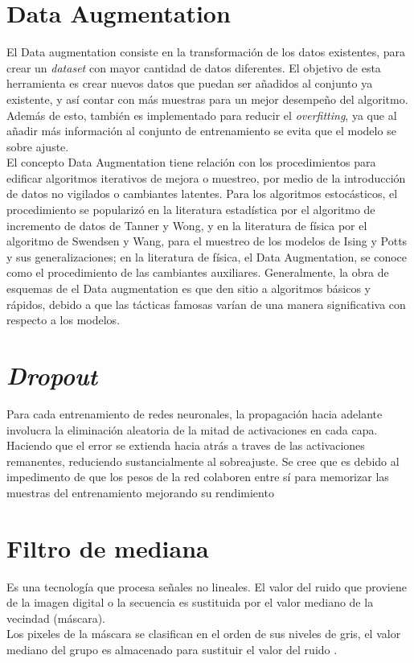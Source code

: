 \section{Data Augmentation}
El Data augmentation consiste en la transformación de los datos existentes, para crear un \textit{dataset} con mayor cantidad de datos diferentes. El objetivo de esta herramienta es crear nuevos datos que puedan ser añadidos al conjunto ya existente, y así contar con más muestras para un mejor desempeño del algoritmo. Además de esto, también es implementado para reducir el \textit{overfitting}, ya que al añadir más información al conjunto de entrenamiento se evita que el modelo se sobre ajuste. \\


El concepto Data Augmentation tiene relación con los procedimientos para edificar algoritmos iterativos de mejora o muestreo, por medio de la introducción de datos no vigilados o cambiantes latentes. Para los algoritmos estocásticos, el procedimiento se popularizó en la literatura estadística por el algoritmo de incremento de datos de Tanner y Wong, y en la literatura de física por el algoritmo de Swendsen y Wang, para el muestreo de los modelos de Ising y Potts y sus generalizaciones; en la literatura de física, el Data Augmentation, se conoce como el procedimiento de las cambiantes auxiliares. Generalmente, la obra de esquemas de el Data augmentation es que den sitio a algoritmos básicos y rápidos, debido a que las tácticas famosas varían de una manera significativa con respecto a los modelos.\cite{van2001art}

\section{\textit{Dropout}}

Para cada entrenamiento de redes neuronales, la propagación hacia adelante involucra la eliminación aleatoria de la mitad de activaciones en cada capa. Haciendo que el error se extienda hacia atrás a traves de las activaciones remanentes, reduciendo sustancialmente al sobreajuste. Se cree que es debido al impedimento de que los pesos de la red colaboren entre sí para memorizar las muestras del entrenamiento mejorando su rendimiento \cite{hinton2012improving}

\section{Filtro de mediana}

Es una tecnología que procesa señales no lineales. El valor del ruido que proviene de la imagen digital o la secuencia es sustituida por el valor mediano de la vecindad (máscara).\\
Los pixeles de la máscara se clasifican en el orden de sus niveles de gris, el valor mediano del grupo es almacenado para sustituir el valor del ruido \cite{zhu2012improved}.

